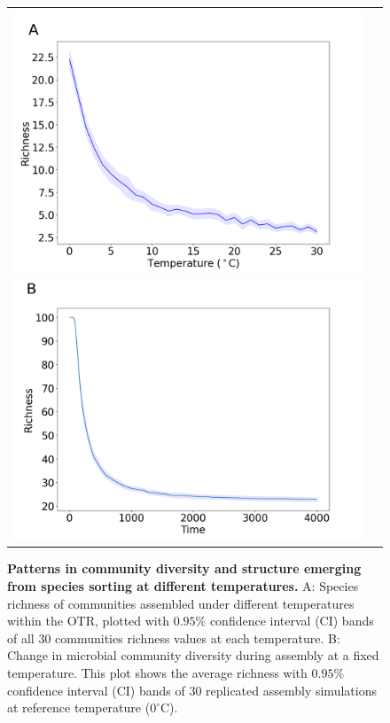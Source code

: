 \documentclass[11pt, a4paper]{article}
\begin{document}
\begin{spacing}{1.5}
\begin{figure}
    \centering
    \begin{tabular}{c@{}c@{}}
    \includegraphics[scale=0.27]{./Figures/selectingEaCUE.png}
    \includegraphics[scale=0.27]{./Figures/rich_decay.png}
    \end{tabular}
    \caption{\textbf{Patterns in community diversity and structure emerging from species sorting at different temperatures.} A: Species richness of communities assembled under different temperatures within the OTR, plotted with $0.95 \%$ confidence interval (CI) bands of all 30 communities richness values at each temperature. B: Change in microbial community diversity during assembly at a fixed temperature. This plot shows the average richness with $0.95 \%$ confidence interval (CI) bands of 30 replicated assembly simulations at reference temperature ($0 ^\circ$C). }
    \label{fig:rich}
\end{figure}


\end{spacing}
\end{document}
